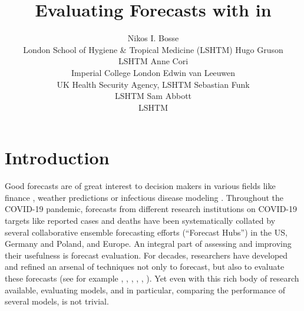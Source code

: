 \documentclass[
]{jss}
\author{
Nikos I. Bosse\\London School of Hygiene \& Tropical Medicine (LSHTM)
\AND Hugo Gruson\\LSHTM \And Anne Cori\\Imperial College London
\AND Edwin van Leeuwen\\UK Health Security Agency,
LSHTM \And Sebastian Funk\\LSHTM \And Sam Abbott\\LSHTM
}
\title{Evaluating Forecasts with \pkg{scoringutils} in \proglang{R}}
\begin{document}
\hypertarget{introduction}{%
\section{Introduction}\label{introduction}}

Good forecasts are of great interest to decision makers in various
fields like finance
\citep{timmermannForecastingMethodsFinance2018, elliottForecastingEconomicsFinance2016},
weather predictions
\citep{gneitingWeatherForecastingEnsemble2005, kukkonenReviewOperationalRegionalscale2012}
or infectious disease modeling
\citep{reichCollaborativeMultiyearMultimodel2019, funkShorttermForecastsInform2020, cramerEvaluationIndividualEnsemble2021, bracherShorttermForecastingCOVID192021, europeancovid-19forecasthubEuropeanCovid19Forecast2021}.
Throughout the COVID-19 pandemic, forecasts from different research
institutions on COVID-19 targets like reported cases and deaths have
been systematically collated by several collaborative ensemble
forecasting efforts (``Forecast Hubs'') in the US, Germany and Poland,
and Europe. An integral part of assessing and improving their usefulness
is forecast evaluation. For decades, researchers have developed and
refined an arsenal of techniques not only to forecast, but also to
evaluate these forecasts (see for example
\cite{goodRationalDecisions1952},
\cite{epsteinScoringSystemProbability1969, murphyNoteRankedProbability1971a, mathesonScoringRulesContinuous1976},
\cite{gneitingProbabilisticForecastsCalibration2007},
\cite{funkAssessingPerformanceRealtime2019},
\cite{gneitingStrictlyProperScoring2007},
\cite{bracherEvaluatingEpidemicForecasts2021}). Yet even with this rich
body of research available, evaluating models, and in particular,
comparing the performance of several models, is not trivial.
\end{document}
